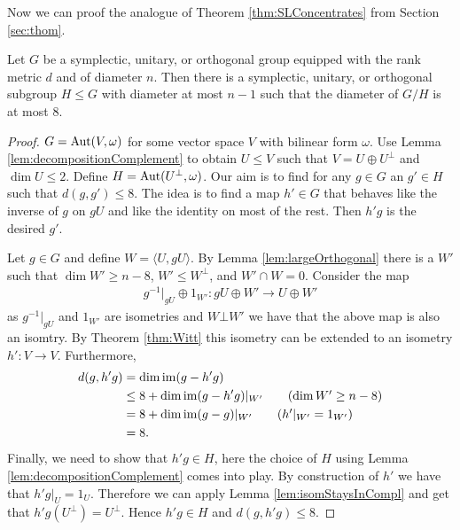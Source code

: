 Now we can proof the analogue of Theorem \ref{thm:SLConcentrates} from Section \ref{sec:thom}.


\begin{theorem}\label{thm:suoBoundDiam}

Let $G$ be a symplectic, unitary, or orthogonal group equipped with the rank metric $d$ and of diameter $n$. Then there is a symplectic, unitary, or orthogonal subgroup $H\leq G$ with diameter at most $n-1$ such that the diameter of $G/H$ is at most $8$.
\end{theorem}
\begin{proof}
$G=\operatorname{Aut}(V,\omega)$ for some vector space $V$ with  bilinear form $\omega$. Use Lemma \ref{lem:decompositionComplement} to obtain $U\leq V$ such that $V=U\oplus U^\bot$ and $\dim U\leq2$. Define $H=\operatorname{Aut}(U^\bot,\omega)$. Our aim is to find for any $g\in G$ an $g'\in H$ such that $d(g,g')\leq8$.
The idea is to find a map $h'\in G$ that behaves like the inverse of $g$ on $gU$ and like the identity on most of the rest. Then $h'g$ is the desired $g'$.

Let $g\in G$ and define $W=\langle U,gU\rangle$. By Lemma \ref{lem:largeOrthogonal} there is a $W'$ such that $\dim W'\geq n-8$, $W'\leq W^\bot$, and $W'\cap W=0$. Consider the map
\begin{align*}
 g^{-1}|_{gU}\oplus 1_{W'}\colon gU\oplus W'\to U\oplus W'
\end{align*}
as $g^{-1}|_{gU}$ and $1_{W'}$ are isometries and $W\bot W'$ we have that the above map is also an isomtry. By Theorem \ref{thm:Witt} this isometry can be extended to an isometry $h'\colon V\to V$. Furthermore,
\begin{align*}
 d(g,h'g)&=\dim\im (g-h'g)\\
&\leq 8+\dim \im(g-h'g)|_{W'}\tag{$\dim W'\geq n-8$}\\
&= 8+\dim \im(g-g)|_{W'}\tag{$h'|_{W'}=1_{W'}$}\\
&=8.
\end{align*}
Finally, we need to show that $h'g\in H$, here the choice of $H$ using Lemma \ref{lem:decompositionComplement} comes into play. By construction of $h'$ we have that $h'g|_U=1_U$. Therefore we can apply Lemma \ref{lem:isomStaysInCompl} and get that $h'g(U^\bot)= U^\bot$. Hence $h'g\in H$ and $d(g,h'g)\leq8$.

\end{proof}

